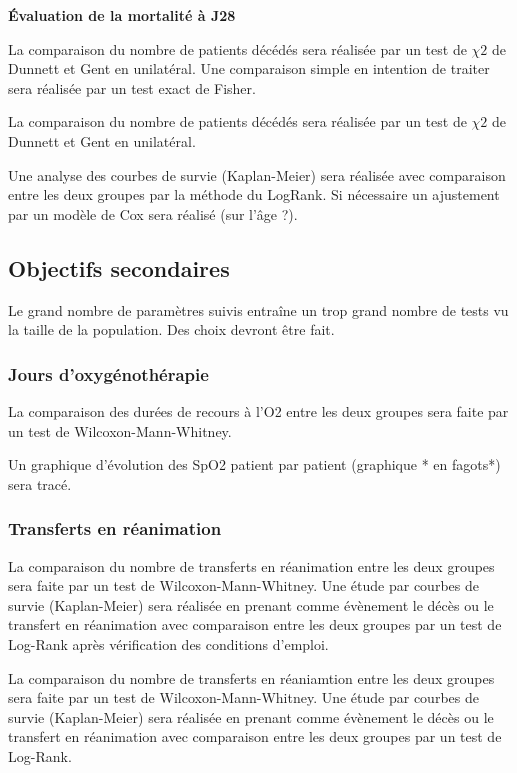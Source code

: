 \documentclass[
]{article}
\begin{document}
\textbf{Évaluation de la mortalité à J28}

La comparaison du nombre de patients décédés sera réalisée par un test
de \(\chi 2\) de Dunnett et Gent en unilatéral. Une comparaison simple
en intention de traiter sera réalisée par un test exact de Fisher.

La comparaison du nombre de patients décédés sera réalisée par un test
de \(\chi 2\) de Dunnett et Gent en unilatéral.

Une analyse des courbes de survie (Kaplan-Meier) sera réalisée avec
comparaison entre les deux groupes par la méthode du LogRank. Si
nécessaire un ajustement par un modèle de Cox sera réalisé (sur l'âge
?).

\hypertarget{objectifs-secondaires}{%
\subsection{Objectifs secondaires}\label{objectifs-secondaires}}

Le grand nombre de paramètres suivis entraîne un trop grand nombre de
tests vu la taille de la population. Des choix devront être fait.

\hypertarget{jours-doxyguxe9nothuxe9rapie}{%
\subsubsection{Jours
d'oxygénothérapie}\label{jours-doxyguxe9nothuxe9rapie}}

La comparaison des durées de recours à l'O2 entre les deux groupes sera
faite par un test de Wilcoxon-Mann-Whitney.

Un graphique d'évolution des SpO2 patient par patient (graphique * en
fagots*) sera tracé.

\hypertarget{transferts-en-ruxe9animation}{%
\subsubsection{Transferts en
réanimation}\label{transferts-en-ruxe9animation}}

La comparaison du nombre de transferts en réanimation entre les deux
groupes sera faite par un test de Wilcoxon-Mann-Whitney. Une étude par
courbes de survie (Kaplan-Meier) sera réalisée en prenant comme
évènement le décès ou le transfert en réanimation avec comparaison entre
les deux groupes par un test de Log-Rank après vérification des
conditions d'emploi.

La comparaison du nombre de transferts en réaniamtion entre les deux
groupes sera faite par un test de Wilcoxon-Mann-Whitney. Une étude par
courbes de survie (Kaplan-Meier) sera réalisée en prenant comme
évènement le décès ou le transfert en réanimation avec comparaison entre
les deux groupes par un test de Log-Rank.
\end{document}
